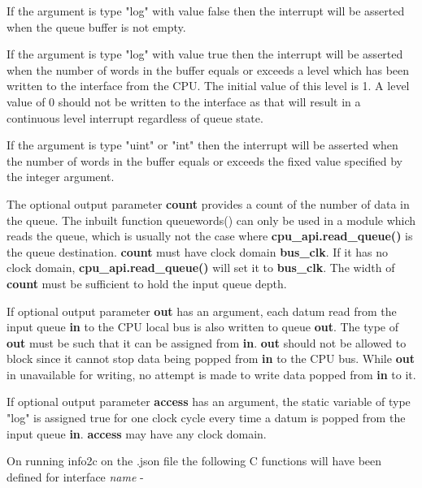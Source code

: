            If the argument is type "log" with value false then the interrupt will
            be asserted when the queue buffer is not empty.

            If the argument is type "log" with value true then the interrupt will be
            asserted when the number of words in the buffer equals or exceeds a
            level which has been written to the interface from the CPU. The initial
            value of this level is 1. A level value of 0 should not be written to
            the interface as that will result in a continuous level interrupt
            regardless of queue state.

            If the argument is type "uint" or "int" then the interrupt will be
            asserted when the number of words in the buffer equals or exceeds the
            fixed value specified by the integer argument.

            The optional output parameter {\bf count} provides a count of the
            number of data in the queue. The inbuilt function queuewords() can
            only be used in a module which reads the queue, which is usually not
            the case where {\bf cpu\_api.read\_queue()} is the queue destination.
            {\bf count} must have clock domain {\bf bus\_clk}. If it has no clock
            domain, {\bf cpu\_api.read\_queue()} will set it to {\bf bus\_clk}.
            The width of {\bf count} must be sufficient to hold the input queue
            depth.

            If optional output parameter {\bf out} has an argument, each datum
            read from the input queue {\bf in} to the CPU local bus is also
            written to queue {\bf out}. The type of {\bf out} must be such that
            it can be assigned from {\bf in}. {\bf out} should not be allowed to
            block since it cannot stop data being popped from {\bf in} to the CPU
            bus. While {\bf out} in unavailable for writing, no attempt is made
            to write data popped from {\bf in} to it.

            If optional output parameter {\bf access} has an argument, the static
            variable of type "log" is assigned true for one clock cycle every
            time a datum is popped from the input queue {\bf in}. {\bf access}
            may have any clock domain.
            
            On running info2c on the .json file the following C functions will have
            been defined for interface {\em name} -
            
